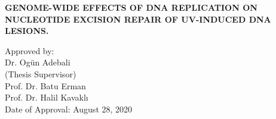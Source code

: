 \clearpage\pagebreak
\thispagestyle{empty} 
\onehalfspacing

\begin{tightcenter} 
\MakeUppercase{\textbf{GENOME-WIDE EFFECTS OF DNA REPLICATION ON
NUCLEOTIDE EXCISION REPAIR OF UV-INDUCED
DNA LESIONS.}}
\end{tightcenter}

\vspace{3\baselineskip}

Approved by:\\[3\baselineskip]
\setlength\parindent{1.25cm}
Dr. Ogün Adebali \dotfill \\
\indent (Thesis Supervisor) \\[2\baselineskip]
Prof. Dr. Batu Erman \dotfill \\[3\baselineskip]
Prof. Dr. Halil Kavaklı \dotfill \\[3\baselineskip]
\setlength\parindent{0cm}
Date of Approval: August 28, 2020

\clearpage\pagebreak
\thispagestyle{plain}